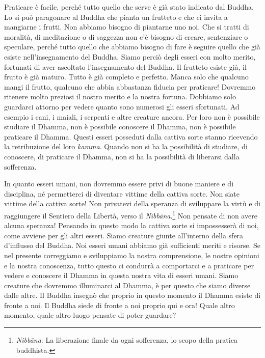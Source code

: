 Praticare è facile, perché tutto quello che serve è già stato indicato
dal Buddha. Lo si può paragonare al Buddha che pianta un frutteto e che
ci invita a mangiarne i frutti. Non abbiamo bisogno di piantarne uno
noi. Che si tratti di moralità, di meditazione o di saggezza non c'è
bisogno di creare, sentenziare o speculare, perché tutto quello che
abbiamo bisogno di fare è seguire quello che già esiste
nell'insegnamento del Buddha. Siamo perciò degli esseri con molto
merito, fortunati di aver ascoltato l'insegnamento del Buddha. Il
frutteto esiste già, il frutto è già maturo. Tutto è già completo e
perfetto. Manca solo che qualcuno mangi il frutto, qualcuno che abbia
abbastanza fiducia per praticare! Dovremmo ritenere molto preziosi il
nostro merito e la nostra fortuna. Dobbiamo solo guardarci attorno per
vedere quanto sono numerosi gli esseri sfortunati. Ad esempio i cani, i
maiali, i serpenti e altre creature ancora. Per loro non è possibile
studiare il Dhamma, non è possibile conoscere il Dhamma, non è possibile
praticare il Dhamma. Questi esseri posseduti dalla cattiva sorte stanno
ricevendo la retribuzione del loro \emph{kamma}. Quando non si ha la
possibilità di studiare, di conoscere, di praticare il Dhamma, non si ha
la possibilità di liberarsi dalla sofferenza.

In quanto esseri umani, non dovremmo essere privi di buone maniere e di
disciplina, né permetterci di diventare vittime della cattiva sorte. Non
siate vittime della cattiva sorte! Non privatevi della speranza di
sviluppare la virtù e di raggiungere il Sentiero della Libertà, verso il
\emph{Nibbāna}.\footnote{\emph{Nibbāna}: La liberazione finale da ogni
  sofferenza, lo scopo della pratica buddhista.} Non pensate di non
avere alcuna speranza! Pensando in questo modo la cattiva sorte si
impossesserà di noi, come avviene per gli altri esseri. Siamo creature
giunte all'interno della sfera d'influsso del Buddha. Noi esseri umani
abbiamo già sufficienti meriti e risorse. Se nel presente correggiamo e
sviluppiamo la nostra comprensione, le nostre opinioni e la nostra
conoscenza, tutto questo ci condurrà a comportarci e a praticare per
vedere e conoscere il Dhamma in questa nostra vita di esseri umani.
Siamo creature che dovremmo illuminarci al Dhamma, è per questo che
siamo diverse dalle altre. Il Buddha insegnò che proprio in questo
momento il Dhamma esiste di fronte a noi. Il Buddha siede di fronte a
noi proprio qui e ora! Quale altro momento, quale altro luogo pensate di
poter guardare?

